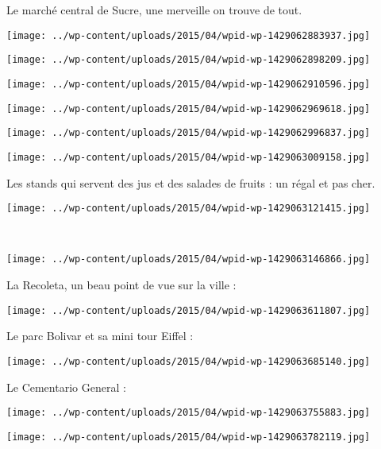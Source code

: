  Le marché central de Sucre, une merveille on trouve de tout. 
\begin{center} \texttt{[image: ../wp-content/uploads/2015/04/wpid-wp-1429062883937.jpg]} \end{center}
\begin{center} \texttt{[image: ../wp-content/uploads/2015/04/wpid-wp-1429062898209.jpg]} \end{center}
\begin{center} \texttt{[image: ../wp-content/uploads/2015/04/wpid-wp-1429062910596.jpg]} \end{center}
\begin{center} \texttt{[image: ../wp-content/uploads/2015/04/wpid-wp-1429062969618.jpg]} \end{center}
\begin{center} \texttt{[image: ../wp-content/uploads/2015/04/wpid-wp-1429062996837.jpg]} \end{center}
\begin{center} \texttt{[image: ../wp-content/uploads/2015/04/wpid-wp-1429063009158.jpg]} \end{center}

  Les stands qui servent des jus et des salades de fruits : un régal et pas cher. 
\begin{center} \texttt{[image: ../wp-content/uploads/2015/04/wpid-wp-1429063121415.jpg]} \end{center}
\vspace{-\topsep}

\pagebreak
~
\begin{center} \texttt{[image: ../wp-content/uploads/2015/04/wpid-wp-1429063146866.jpg]} \end{center}

 La Recoleta, un beau point de vue sur la ville :
\begin{center} \texttt{[image: ../wp-content/uploads/2015/04/wpid-wp-1429063611807.jpg]} \end{center}
\vspace{-\topsep}

\pagebreak
 Le parc Bolivar et sa mini tour Eiffel :
\begin{center} \texttt{[image: ../wp-content/uploads/2015/04/wpid-wp-1429063685140.jpg]} \end{center}

 Le Cementario General :
\begin{center} \texttt{[image: ../wp-content/uploads/2015/04/wpid-wp-1429063755883.jpg]} \end{center}
\begin{center} \texttt{[image: ../wp-content/uploads/2015/04/wpid-wp-1429063782119.jpg]} \end{center}

